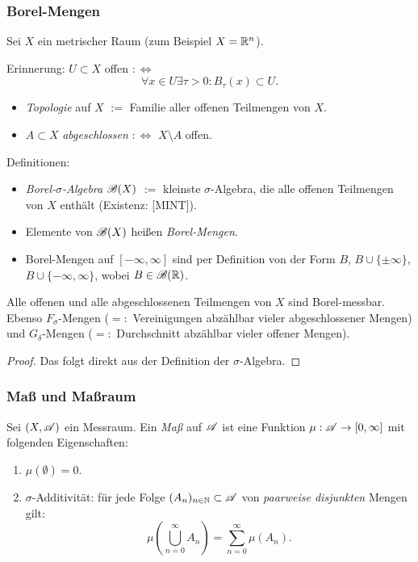 \documentclass[
 a4paper,
 12pt,
 parskip=half
 ]{scrartcl}
\theoremstyle{plain}
\theoremstyle{definition}
\numberwithin{equation}{section}
\begin{document}
\subsubsection{Borel-Mengen}
Sei $X$ ein metrischer Raum (zum Beispiel $X = \mathbb{R}^n$). 

Erinnerung: $U \subset X$ offen $:\Leftrightarrow$
\[ \forall x \in U \exists \tau > 0: B_\tau(x) \subset U. \]
\begin{itemize}
 \item \emph{Topologie} auf $X$ $:=$ Familie aller offenen Teilmengen von $X$.
 \item $A \subset X$ \emph{abgeschlossen} $:\Leftrightarrow$ $X \setminus A$ offen.
\end{itemize}

Definitionen:
\begin{itemize}
 \item \emph{Borel-$\sigma$-Algebra} $\mathscr{B}(X)$ $:=$ kleinste $\sigma$-Algebra, die alle offenen Teilmengen von $X$ enthält (Existenz: [MINT]).
 \item Elemente von $\mathscr{B}(X)$ heißen \emph{Borel-Mengen}.
 \item Borel-Mengen auf $[-\infty,\infty]$ sind per Definition von der Form $B$, $B \cup \{ \pm \infty \}$, $B \cup \{ -\infty, \infty \}$, wobei $B \in \mathscr{B}(\mathbb{R})$.
\end{itemize}

\begin{bem}
 Alle offenen und alle abgeschlossenen Teilmengen von $X$ sind Borel-messbar. Ebenso $F_\sigma$-Mengen ($=:$ Vereinigungen abzählbar vieler abgeschlossener Mengen) und $G_\delta$-Mengen ($=:$ Durchschnitt abzählbar vieler offener Mengen).
\end{bem}

\begin{proof}
 Das folgt direkt aus der Definition der $\sigma$-Algebra.
\end{proof}

\subsubsection{Maß und Maßraum}
Sei $(X,\mathscr{A})$ ein Messraum. Ein \emph{Maß} auf $\mathscr{A}$ ist eine Funktion $\mu: \mathscr{A} \to [0,\infty]$ mit folgenden Eigenschaften:
\begin{enumerate}
 \item $\mu(\emptyset)=0$.
 \item $\sigma$-Additivität: für jede Folge $(A_n)_{n \in \mathbb{N}} \subset \mathscr{A}$ von \emph{paarweise disjunkten} Mengen gilt:
 \[ \mu\left( \bigcup_{n=0}^\infty A_n \right) = \sum_{n=0}^\infty \mu(A_n). \]
\end{enumerate}
\end{document}
